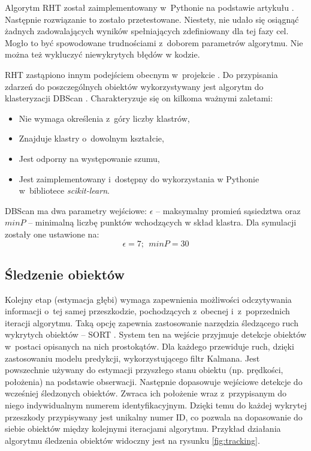 Algorytm RHT został zaimplementowany w~Pythonie na podstawie artykułu \cite{RHT}. Następnie rozwiązanie to zostało przetestowane. Niestety, nie udało się osiągnąć żadnych zadowalających wyników spełniających zdefiniowany dla tej fazy cel. Mogło to być spowodowane trudnościami z~doborem parametrów algorytmu. Nie można też wykluczyć niewykrytych błędów w kodzie.

\vspace{11px}

RHT zastąpiono innym podejściem obecnym w~projekcie \cite{dynamic_obstacle}. Do przypisania zdarzeń do poszczególnych obiektów wykorzystywany jest algorytm do klasteryzacji DBScan \cite{DBScan}. Charakteryzuje się on kilkoma ważnymi zaletami:
\begin{itemize}
    \item Nie wymaga określenia z~góry liczby klastrów,
    \item Znajduje klastry o~dowolnym kształcie,
    \item Jest odporny na występowanie szumu,
    \item Jest zaimplementowany i~dostępny do wykorzystania w Pythonie w~bibliotece \textit{scikit-learn}.
\end{itemize}

DBScan ma dwa parametry wejściowe: $\epsilon$ -- maksymalny promień sąsiedztwa oraz $minP$ -- minimalną liczbę punktów wchodzących w skład klastra. Dla symulacji zostały one ustawione na:
$$\epsilon=7 ; ~~minP=30 $$



\subsection{Śledzenie obiektów}
\label{sec:tracking}

Kolejny etap (estymacja głębi) wymaga zapewnienia możliwości odczytywania informacji o~tej samej przeszkodzie, pochodzących z~obecnej i~z~poprzednich iteracji algorytmu. Taką opcję zapewnia zastosowanie narzędzia śledzącego ruch wykrytych obiektów -- SORT \cite{sort}. System ten na wejście przyjmuje detekcje obiektów w~postaci opisanych na nich prostokątów. Dla każdego przewiduje ruch, dzięki zastosowaniu modelu predykcji, wykorzystującego filtr Kalmana. Jest powszechnie używany do estymacji przyszłego stanu obiektu (np. prędkości, położenia) na podstawie obserwacji. Następnie dopasowuje wejściowe detekcje do wcześniej śledzonych obiektów. Zwraca ich położenie wraz z~przypisanym do niego indywidualnym numerem identyfikacyjnym. Dzięki temu do każdej wykrytej przeszkody przypisywany jest unikalny numer ID, co pozwala na dopasowanie do siebie obiektów między kolejnymi iteracjami algorytmu. Przykład działania algorytmu śledzenia obiektów widoczny jest na rysunku \ref{fig:tracking}.

